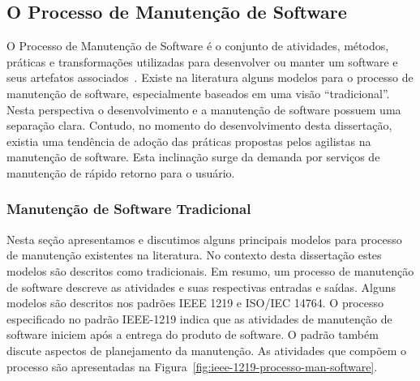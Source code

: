 \subsection{O Processo de Manutenção de Software}
\label{sec:o_processo_de_manutecao_de_software}

O Processo de Manutenção de Software é o conjunto de atividades, métodos,
práticas e transformações utilizadas para desenvolver ou manter um software e
seus artefatos associados~\cite{paulk1993key}. Existe na literatura alguns
modelos para o processo de manutenção de software, especialmente baseados em uma
visão ``tradicional''. Nesta perspectiva o desenvolvimento e a manutenção de
software possuem uma separação clara. Contudo, no momento do desenvolvimento
desta dissertação, existia uma tendência de adoção das práticas propostas pelos
agilistas na manutenção de software. Esta inclinação surge da demanda por
serviços de manutenção de rápido retorno para o usuário.


\subsubsection{Manutenção de Software Tradicional}
\label{subsec:manutenção_de_software_tradicional}

Nesta seção apresentamos e discutimos alguns principais modelos para processo de
manutenção existentes na literatura. No contexto desta dissertação estes modelos
são descritos como tradicionais. Em resumo, um processo de manutenção de
software descreve as atividades e suas respectivas entradas e saídas. Alguns
modelos são descritos nos padrões IEEE 1219 e ISO/IEC 14764. O processo
especificado no padrão IEEE\@-\@1219 indica que as atividades de manutenção de
software iniciem após a entrega do produto de software. O padrão também discute
aspectos de planejamento da manutenção. As atividades que compõem o processo são
apresentadas na Figura~\ref{fig:ieee-1219-processo-man-software}.

